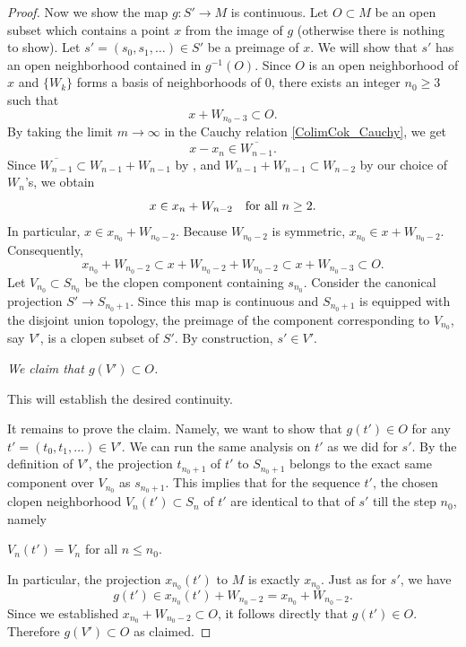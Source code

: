 \documentclass[11pt]{amsart}
\newcommand{\ra}{\rightarrow} %
\renewcommand{\bar}{\overline}
\theoremstyle{plain}
\theoremstyle{definition}
\numberwithin{equation}{prop}
\begin{document}
\begin{proof}
Now we show the map $g: S' \to M$ is continuous. 
Let $O\subset M$ be an open subset which contains a point $x $ from the image of $g$ (otherwise there is nothing to show).
Let $s'=(s_0,s_1,\dots)\in S'$ be a preimage of $x$.
We will show that $s'$ has an open neighborhood contained in $g^{-1}(O)$.
Since $O$ is an open neighborhood of $x$ and $\{W_k\}$ forms a basis of neighborhoods of $0$, there exists an integer $n_0 \ge 3$ such that 
$$x + W_{n_0-3} \subset O.$$
By taking the limit $m \to \infty$ in the Cauchy relation \eqref{ColimCok_Cauchy}, we get
$$x - x_n \in \bar{W_{n-1}} .$$
Since $\bar{W_{n-1}} \subset W_{n-1} + W_{n-1} $ by  \cite[Proposition 1.4.4]{AT_TopGp}, and 
$ W_{n-1} + W_{n-1}\subset W_{n-2}$ by our choice of $W_n$'s, we obtain
$$x \in  x_n + W_{n-2}
\text{\quad  for all $n \ge 2$.}$$
In particular, $ x \in x_{n_0}+ W_{n_0-2}$. 
Because $W_{n_0-2}$ is symmetric, 
$x_{n_0} \in x + W_{n_0-2}$.
Consequently, 
$$x_{n_0}+ W_{n_0-2} \subset x+ W_{n_0-2} + W_{n_0-2} \subset x + W_{n_0-3} \subset O.$$
Let $V_{n_0} \subset S_{n_0}$ be the clopen component containing $s_{n_0}$. 
Consider the canonical projection $S'\ra S_{n_0+1}$.
Since this map is continuous and $S_{n_0+1}$ is equipped with the disjoint union topology, the preimage of the component corresponding to $V_{n_0}$, say $V'$, is a clopen subset of $S'$.
By construction, $s' \in V'$.
\begin{center}
\textit{We claim that $g(V')\subset O$.}
\end{center}
This will establish the desired continuity.

It remains to prove the claim.
Namely, we want to show that $g(t')\in O$ for any $t'=(t_0,t_1,\dots)\in V'$.
We can run the same analysis on $t'$ as we did for $s'$.
By the definition of $V'$, the projection $t_{n_0+1}$ of $t'$ to $S_{n_0+1}$ belongs to the exact same component over $V_{n_0}$ as $s_{n_0+1}$. 
This implies that for the sequence $t'$, the chosen clopen neighborhood $V_n(t')\subset S_n$ of $t'$ are identical to that of $s'$ till the step $n_0$, namely 
\begin{center}
$V_n(t')=V_n$ for all $n\le n_0$.
\end{center}
In particular, the projection $x_{n_0}(t')$ to $M$ is exactly $x_{n_0}$.
Just as for $s'$, we have
$$g(t') \in x_{n_0}(t') + W_{n_0-2} = x_{n_0}+ W_{n_0-2}.$$
Since we established $x_{n_0} + W_{n_0-2} \subset O$, it follows directly that $g(t') \in O$.
Therefore $g(V')\subset O$ as claimed.
\end{proof}
\end{document}
